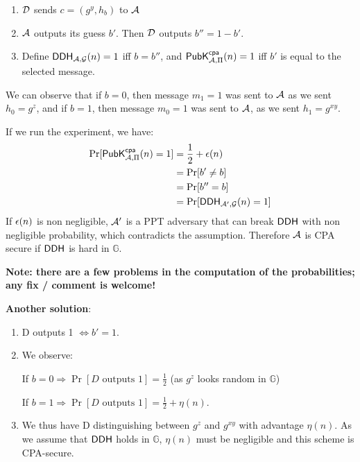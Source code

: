 \begin{solution}
\begin{enumerate}
\begin{enumerate}[label=(\arabic*)]
			\item $\mathcal{D}$ sends $c=(g^y,h_b)$ to $\mathcal{A}$

			\item $\mathcal{A}$ outputs its guess $b'$. Then $\mathcal{D}$ outputs $b''=1-b'$.

			\item Define $\mathsf{DDH}_{\mathcal{A}, \mathcal{G}}(n)=1$ iff $b=b''$, and $\mathsf{PubK}^\mathsf{cpa}_{\mathcal{A},\Pi}(n)=1$ iff $b'$ is equal to the selected message.
		\end{enumerate}
		We can observe that if $b=0$, then message $m_1=1$ was sent to $\mathcal{A}$ as we sent $h_0=g^z$, and if $b=1$, then message $m_0=1$ was sent to $\mathcal{A}$, as we sent $h_1=g^{xy}$.

		If we run the experiment, we have:
		\begin{align*}
			\Pr[\mathsf{PubK}^\mathsf{cpa}_{\mathcal{A},\Pi}(n) = 1] &= \frac{1}{2}+\epsilon(n)\\
			&= \Pr[b'\neq b]\\
			&= \Pr[b''=b]\\
			&= \Pr[\mathsf{DDH}_{\mathcal{A}',\mathcal{G}}(n) = 1]
		\end{align*}
		If $\epsilon(n)$ is non negligible, $\mathcal{A}'$ is a PPT adversary that can break $\mathsf{DDH}$ with non negligible probability, which contradicts the assumption. Therefore $\mathcal{A}$ is CPA secure if $\mathsf{DDH}$ is hard in $\mathbb{G}$.

		\textbf{Note: there are a few problems in the computation of the probabilities; any fix / comment is welcome!}
	\end{enumerate}

	\textbf{Another solution}:

	\begin{enumerate}
		\item D outputs 1 $\Leftrightarrow b'=1$.
		\item We observe:

		If $b=0 \Rightarrow \Pr[D \text{ outputs } 1]=\frac{1}{2}$ (as $g^z$ looks random in $\mathbb{G}$)

		If $b=1 \Rightarrow \Pr[D\text{ outputs }1]=\frac{1}{2}+\eta(n)$.
		\item We thus have D distinguishing between $g^z$ and $g^{xy}$ with advantage $\eta(n)$. As we assume that $\mathsf{DDH}$ holds in $\mathbb{G}$, $\eta(n)$ must be negligible and this scheme is CPA-secure.
	\end{enumerate}
\end{solution}



